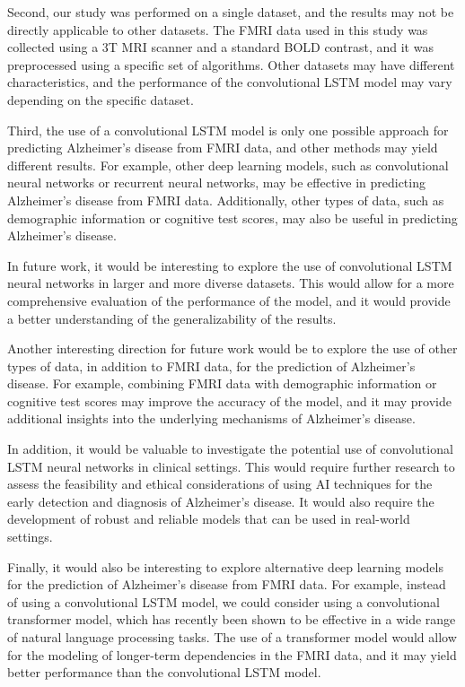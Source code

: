 \documentclass[10pt]{article}
\begin{document}
	Second, our study was performed on a single dataset, and the results may not be directly applicable to other datasets. The FMRI data used in this study was collected using a 3T MRI scanner and a standard BOLD contrast, and it was preprocessed using a specific set of algorithms. Other datasets may have different characteristics, and the performance of the convolutional LSTM model may vary depending on the specific dataset.

	Third, the use of a convolutional LSTM model is only one possible approach for predicting Alzheimer's disease from FMRI data, and other methods may yield different results. For example, other deep learning models, such as convolutional neural networks or recurrent neural networks, may be effective in predicting Alzheimer's disease from FMRI data. Additionally, other types of data, such as demographic information or cognitive test scores, may also be useful in predicting Alzheimer's disease.

	In future work, it would be interesting to explore the use of convolutional LSTM neural networks in larger and more diverse datasets. This would allow for a more comprehensive evaluation of the performance of the model, and it would provide a better understanding of the generalizability of the results.

	Another interesting direction for future work would be to explore the use of other types of data, in addition to FMRI data, for the prediction of Alzheimer's disease. For example, combining FMRI data with demographic information or cognitive test scores may improve the accuracy of the model, and it may provide additional insights into the underlying mechanisms of Alzheimer's disease.

	In addition, it would be valuable to investigate the potential use of convolutional LSTM neural networks in clinical settings. This would require further research to assess the feasibility and ethical considerations of using AI techniques for the early detection and diagnosis of Alzheimer's disease. It would also require the development of robust and reliable models that can be used in real-world settings.

	Finally, it would also be interesting to explore alternative deep learning models for the prediction of Alzheimer's disease from FMRI data. For example, instead of using a convolutional LSTM model, we could consider using a convolutional transformer model, which has recently been shown to be effective in a wide range of natural language processing tasks. The use of a transformer model would allow for the modeling of longer-term dependencies in the FMRI data, and it may yield better performance than the convolutional LSTM model.
\end{document}
